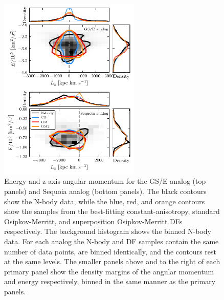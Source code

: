 \begin{figure}
    \centering
    \includegraphics[width=0.6\textwidth]{figure/ch4/energy_Lz.pdf}
    \caption{Energy and z-axis angular momentum for the GS/E analog (top panels) and Sequoia analog (bottom panels). The black contours show the N-body data, while the blue, red, and orange contours show the samples from the best-fitting constant-anisotropy, standard Osipkov-Merritt, and superposition Osipkov-Merritt DFs respectively. The background histogram shows the binned N-body data. For each analog the N-body and DF samples contain the same number of data points, are binned identically, and the contours rest at the same levels. The smaller panels above and to the right of each primary panel show the density margins of the angular momentum and energy respectively, binned in the same manner as the primary panels.}
    \label{ch4:fig:case_study_ELz}
\end{figure}

